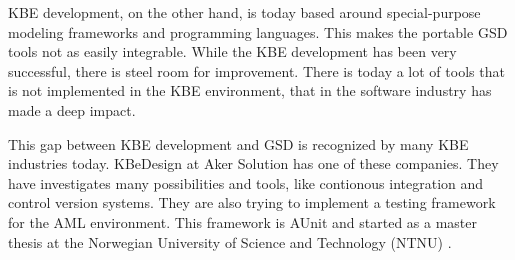 KBE development, on the other hand, is today based around special-purpose modeling frameworks and programming languages. This makes the portable GSD tools not as easily integrable. While the KBE development has been very successful, there is steel room for improvement. There is today a lot of tools that is not implemented in the KBE environment, that in the software industry has made a deep impact.


This gap between KBE development and GSD is recognized by many KBE industries today. KBeDesign at Aker Solution has one of these companies. They have investigates many possibilities and tools, like contionous integration and control version systems. They are also trying to implement a testing framework for the AML environment. This framework is AUnit and started as a master thesis at the Norwegian University of Science and Technology (NTNU) \citep{aunit}.













